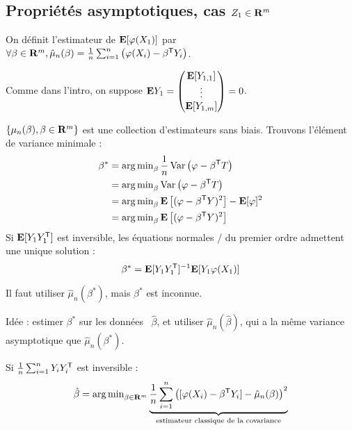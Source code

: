 


\subsection{Propriétés asymptotiques, cas $Z_1 \in \mathbf{R}^m$}

	On définit l'estimateur de $\mathbf{E}[\varphi(X_1)]$ par $\forall \beta \in \mathbf{R}^m, \hat{\mu}_n(\beta) = \frac{1}{n} \sum_{i = 1}^n \left( \varphi(X_i) - \beta^\mathsf{T}Y_i \right)$.

	Comme dans l'intro, on suppose $\mathbf{E} Y_1 = \begin{pmatrix}
		\mathbf{E}[Y_{1,1}] \\ \vdots \\ \mathbf{E}[Y_{1,m}]
		\end{pmatrix} = 0$.
		
	$\{ \mu_n(\beta), \beta \in \mathbf{R}^m \}$ est une collection d'estimateurs sans biais.
	Trouvons l'élément de variance minimale :
	\begin{align*}
		\beta^* & = \operatorname{arg\, min}_\beta \frac{1}{n} \operatorname{Var} \left( \varphi - \beta^\mathsf{T} T \right) \\
		        & = \operatorname{arg\, min}_\beta \operatorname{Var} \left( \varphi - \beta^\mathsf{T} T \right) \\
		        & = \operatorname{arg\, min}_\beta \mathbf{E} \left[ (\varphi - \beta^\mathsf{T} Y)^2 \right] - \mathbf{E}[\varphi]^2 \\
		        & = \operatorname{arg\, min}_\beta \mathbf{E} \left[ (\varphi - \beta^\mathsf{T} Y)^2 \right]
	\end{align*}
	Si $\mathbf{E}[Y_1 Y_1^\mathsf{T}]$ est inversible, les équations normales / du premier ordre admettent une unique solution :
	$$\beta^* = \mathbf{E}[Y_1 Y_1^\mathsf{T}]^{-1} \mathbf{E}[Y_1 \varphi(X_1)]$$
	
	Il faut utiliser $\hat{\mu}_n(\beta^*)$, mais $\beta^*$ est inconnue.
	
	Idée : estimer $\beta^*$ sur les données \textrightarrow\ $\hat{\beta}$, et utiliser $\hat{\mu}_n(\hat{\beta})$, qui a la même variance asymptotique que $\hat{\mu}_n(\beta^*)$.
	
	Si $\frac{1}{n} \sum_{i = 1}^n Y_i Y_i^\mathsf{T}$ est inversible :
	$$\hat{\beta} = \operatorname{arg\, min}_{\beta \in \mathbf{R}^m}
	\underset{\text{estimateur classique de la covariance}}{\underbrace{\frac{1}{n} \sum_{i = 1}^n \left( [\varphi(X_i) - \beta^\mathsf{T} Y_i] - \hat{\mu}_n(\beta) \right)^2}}$$
	
